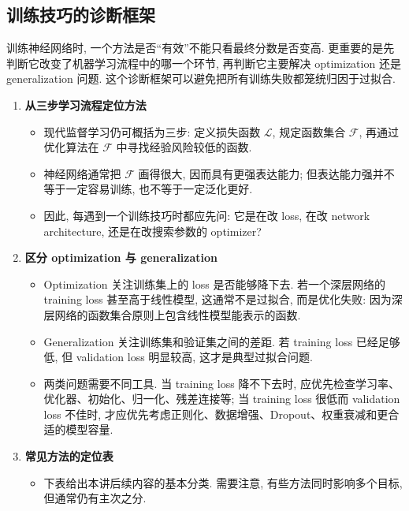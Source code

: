 \documentclass{../nndlcourse}
\begin{document}
\subsection{训练技巧的诊断框架}

训练神经网络时, 一个方法是否“有效”不能只看最终分数是否变高. 更重要的是先判断它改变了机器学习流程中的哪一个环节, 再判断它主要解决 optimization 还是 generalization 问题. 这个诊断框架可以避免把所有训练失败都笼统归因于过拟合.

\begin{enumerate}
  \item \textbf{从三步学习流程定位方法}
    \begin{itemize}
      \item 现代监督学习仍可概括为三步: 定义损失函数 $\mathcal{L}$, 规定函数集合 $\mathcal{F}$, 再通过优化算法在 $\mathcal{F}$ 中寻找经验风险较低的函数.
      \item 神经网络通常把 $\mathcal{F}$ 画得很大, 因而具有更强表达能力; 但表达能力强并不等于一定容易训练, 也不等于一定泛化更好.
      \item 因此, 每遇到一个训练技巧时都应先问: 它是在改 loss, 在改 network architecture, 还是在改搜索参数的 optimizer?
    \end{itemize}
  \item \textbf{区分 optimization 与 generalization}
    \begin{itemize}
      \item Optimization 关注训练集上的 loss 是否能够降下去. 若一个深层网络的 training loss 甚至高于线性模型, 这通常不是过拟合, 而是优化失败: 因为深层网络的函数集合原则上包含线性模型能表示的函数.
      \item Generalization 关注训练集和验证集之间的差距. 若 training loss 已经足够低, 但 validation loss 明显较高, 这才是典型过拟合问题.
      \item 两类问题需要不同工具. 当 training loss 降不下去时, 应优先检查学习率、优化器、初始化、归一化、残差连接等; 当 training loss 很低而 validation loss 不佳时, 才应优先考虑正则化、数据增强、Dropout、权重衰减和更合适的模型容量.
    \end{itemize}
  \item \textbf{常见方法的定位表}
    \begin{itemize}
      \item 下表给出本讲后续内容的基本分类. 需要注意, 有些方法同时影响多个目标, 但通常仍有主次之分.
    \end{itemize}
    \begin{center}
    \begin{tabular}{lll}

\end{tabular}
\end{center}
\end{enumerate}
\end{document}
